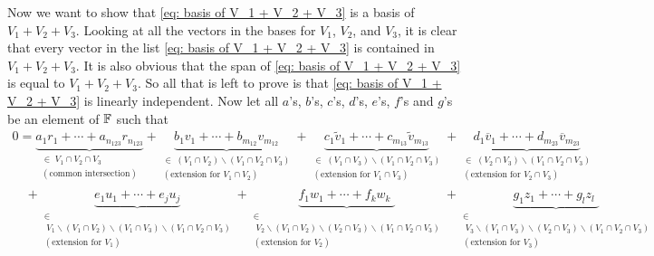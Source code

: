 \begin{xrcs}
  Now we want to show that \eqref{eq: basis of V_1 + V_2 + V_3} is a basis of $V_1 + V_2 + V_3$. Looking at all the  vectors in the bases for $V_1$, $V_2$, and $V_3$, it is clear that every vector in the list \eqref{eq: basis of V_1 + V_2 + V_3} is contained in $V_1 + V_2 + V_3$. It is also obvious that the span of \eqref{eq: basis of V_1 + V_2 + V_3} is equal to $V_1 + V_2 + V_3$.
  So all that is left to prove is that \eqref{eq: basis of V_1 + V_2 + V_3} is linearly independent. Now let all $a$'s, $b$'s, $c$'s, $d$'s, $e$'s, $f$'s and $g$'s be an element of $\mathbb{F}$ such that
  \begin{equation}
    \label{eq: linear independence formula}
    \begin{aligned}
    0 = \underbrace{a_1r_1 + \cdots + a_{n_{123}} r_{n_{123}}}_{\substack{\in \; V_1 \cap V_2 \cap V_3 \\ (\text{common intersection})}}
    + \underbrace{b_1v_1 + \cdots + b_{m_{12}} v_{m_{12}}}_{
        \substack{\in \; (V_1 \cap V_2) \backslash (V_1 \cap V_2 \cap V_3) \\ (\text{extension for } V_1 \cap V_2)}}
    + \underbrace{c_1\widetilde{v}_1 + \cdots + c_{m_{13}}\widetilde{v}_{m_{13}}}_{
        \substack{\in \; (V_1 \cap V_3) \backslash (V_1 \cap V_2 \cap V_3) \\ (\text{extension for } V_1 \cap V_3)}}
    + \underbrace{d_1\overline{v}_1 + \cdots + d_{m_{23}}\overline{v}_{m_{23}}}_{
        \substack{\in \; (V_2 \cap V_3) \backslash (V_1 \cap V_2 \cap V_3) \\ (\text{extension for } V_2 \cap V_3)}} \\
    \quad
    + \underbrace{e_1 u_1 + \cdots + e_j u_j}_{
      \substack{\in \\ \; V_1 \backslash (V_1 \cap V_2 ) \backslash (V_1 \cap V_3) \backslash (V_1 \cap V_2 \cap V_3)  \\ (\text{extension for } V_1)}}
    + \underbrace{f_1 w_1 + \cdots + f_k w_k \phantom{_j}\!\!\!}_{
      \substack{\in \\  \; V_2 \backslash (V_1 \cap V_2 ) \backslash (V_2 \cap V_3) \backslash (V_1 \cap V_2 \cap V_3) \\ (\text{extension for } V_2)}}
    + \underbrace{g_1 z_1 + \cdots + g_l z_l \phantom{_j}\!\!\!}_{
      \substack{\in \\ \; V_3 \backslash (V_1 \cap V_3 ) \backslash (V_2 \cap V_3) \backslash (V_1 \cap V_2 \cap V_3) \\ (\text{extension for } V_3)}}
    \end{aligned}
  \end{equation}



\end{xrcs}
